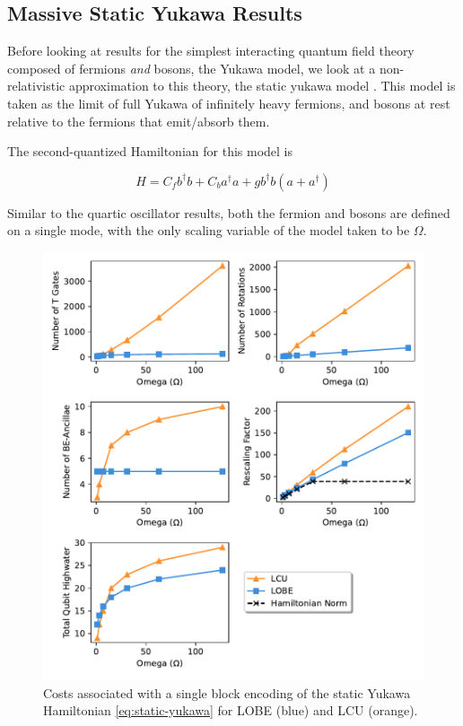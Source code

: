 \subsection{Massive Static Yukawa Results}
\label{sec:static_yukawa}

Before looking at results for the simplest interacting quantum field theory composed of fermions \textit{and} bosons, the Yukawa model, we look at a non-relativistic approximation to this theory, the static yukawa model \cite{PhysRevD.103.014021}.
This model is taken as the limit of full Yukawa of infinitely heavy fermions, and bosons at rest relative to the fermions that emit/absorb them.

The second-quantized Hamiltonian for this model is 

\begin{equation}
    \label{eq:static-yukawa}
    H = C_f b^\dagger b + C_b a^\dagger a + g b^\dagger b \left( a + a^\dagger \right)
\end{equation}
 
Similar to the quartic oscillator results, both the fermion and bosons are defined on a single mode, with the only scaling variable of the model taken to be $\Omega$.

\begin{figure}[h]
    \centering
    \includegraphics[width = 15cm]{figures/static_yukawa.pdf}
    \caption{Costs associated with a single block encoding of the static Yukawa Hamiltonian \ref{eq:static-yukawa} for LOBE (blue) and LCU (orange).}
    \label{fig:qosc}
\end{figure}
